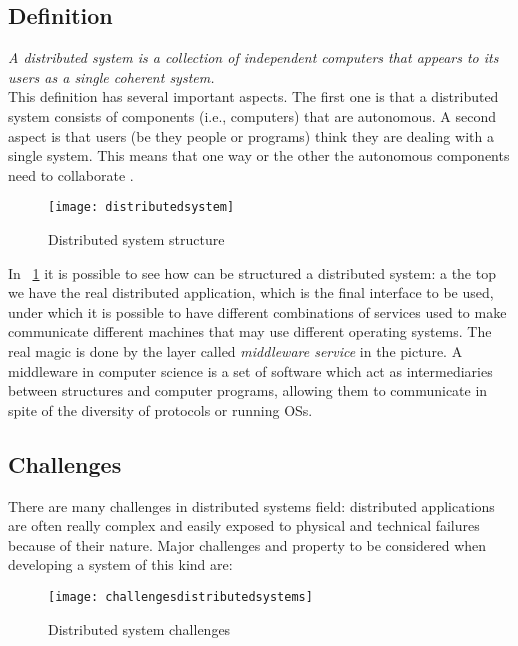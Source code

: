 \subsection{Definition}\label{distdef}
\textit{A distributed system is a collection of independent computers that appears to its users as a single coherent system.}\\
This definition has several important aspects. The first one is that a distributed system consists of components (i.e., computers) that are autonomous. A second aspect is that users (be they people or programs) think they are dealing with a single
system. This means that one way or the other the autonomous components need to collaborate \cite{tanenbaum2010distributed}.\\
\begin{figure}[h]
	\centering
	\texttt{[image: distributedsystem]}
	\caption{Distributed system structure}
	\label{fig:2.8}
\end{figure}
In \figurename~\ref{fig:2.8} it is possible to see how can be structured a distributed system: a the top we have the real distributed application, which is the final interface to be used, under which it is possible to have different combinations of services used to make communicate different machines that may use different operating systems. The real magic is done by the layer called \textit{middleware service} in the picture. A middleware in computer science is a set of software which act as intermediaries between structures and computer programs, allowing them to communicate in spite of the diversity of protocols or running OSs.

\subsection{Challenges} \label{chall}
There are many challenges in distributed systems field: distributed applications are often really complex and easily exposed to physical and technical failures because of their nature. Major challenges and property to be considered when developing a system of this kind are:

\begin{figure}[h]
	\centering
	\texttt{[image: challengesdistributedsystems]}
	\caption{Distributed system challenges}
	\label{fig:2.9}
\end{figure} 

